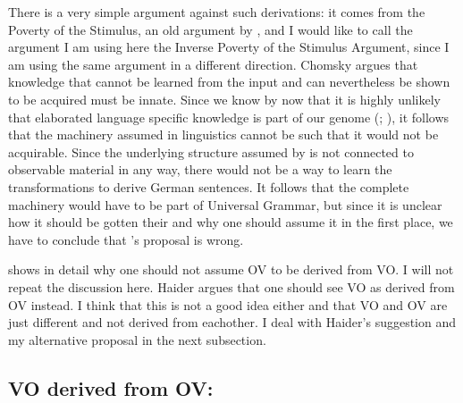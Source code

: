 \noindent
There is a very simple argument against such derivations: it comes from the Poverty of the
Stimulus, an old argument by \citet[]{Chomsky80b-u}, and I would like to call the argument I
am using here the Inverse Poverty of the Stimulus Argument, since I am using the same argument in a
different direction. Chomsky argues that knowledge that cannot be learned from the
input and can nevertheless be shown to be acquired must be innate. Since we know by now that it is
highly unlikely that elaborated language specific knowledge is part of our genome
(\citealt*{HCF2002a}; \cites{Bishop2002a}[Section~6.4.2.2]{Dabrowska2004a}{FM2005a}), it follows that
the machinery assumed in linguistics cannot be such that it would not be acquirable. Since the
underlying structure assumed by \citeauthor{Laenzlinger2004a} is not connected to observable
material in any way, there would not be a way to learn the transformations to derive German
sentences. It follows that the complete machinery would have to be part of Universal Grammar, but
since it is unclear how it should be gotten their and why one should assume it in the first place,
we have to conclude that \citeauthor{Kayne94a-u}'s proposal is wrong.

\citet{Haider2000a} shows in detail why one should not assume OV to be derived from VO. I will not
repeat the discussion here. Haider argues that one should see VO as derived from OV instead. I think
that this is not a good idea either and that VO and OV are just different and not derived from
eachother. I deal with Haider's suggestion and my alternative proposal in the next subsection.



\subsection{VO derived from OV: \citet{Haider2020a}}
\label{sec-vo-derived-from-ov}



